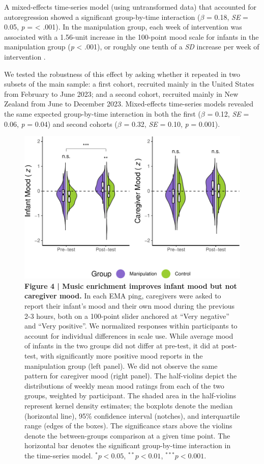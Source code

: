 \documentclass[
]{article}
\begin{document}
A mixed-effects time-series model (using untransformed data) that
accounted for autoregression showed a significant group-by-time
interaction (\(\beta\) = 0.18, \emph{SE} = 0.05, \emph{p} = \textless{}
.001). In the manipulation group, each week of intervention was
associated with a 1.56-unit increase in the 100-point mood scale for
infants in the manipulation group (\emph{p} \textless{} .001), or
roughly one tenth of a \emph{SD} increase per week of intervention .

We tested the robustness of this effect by asking whether it repeated in
two subsets of the main sample: a first cohort, recruited mainly in the
United States from February to June 2023; and a second cohort, recruited
mainly in New Zealand from June to December 2023. Mixed-effects
time-series models revealed the same expected group-by-time interaction
in both the first (\(\beta\) = 0.12, \emph{SE} = 0.06, \emph{p} = 0.04)
and second cohorts (\(\beta\) = 0.32, \emph{SE} = 0.10, \emph{p} =
0.001).

\begin{figure}[p]
\includegraphics{MIPH_childdev_files/figure-latex/fig4-1} \caption{\textbf{Figure 4 | Music enrichment improves infant mood but not caregiver mood.} In each EMA ping, caregivers were asked to report their infant's mood and their own mood during the previous 2-3 hours, both on a 100-point slider anchored at ``Very negative'' and ``Very positive''. We normalized responses within participants to account for individual differences in scale use. While average mood of infants in the two groups did not differ at pre-test, it did at post-test, with significantly more positive mood reports in the manipulation group (left panel). We did not observe the same pattern for caregiver mood (right panel). The half-violins depict the distributions of weekly mean mood ratings from each of the two groups, weighted by participant. The shaded area in the half-violins represent kernel density estimates; the boxplots denote the median (horizontal line), 95\% confidence interval (notches), and interquartile range (edges of the boxes). The significance stars above the violins denote the between-groups comparison at a given time point. The horizontal bar denotes the significant group-by-time interaction in the time-series model. $^{\ast}p < 0.05$, $^{\ast\ast}p < 0.01$, $^{\ast\ast\ast}p < 0.001$.}\label{fig:fig4}
\end{figure}
\end{document}
